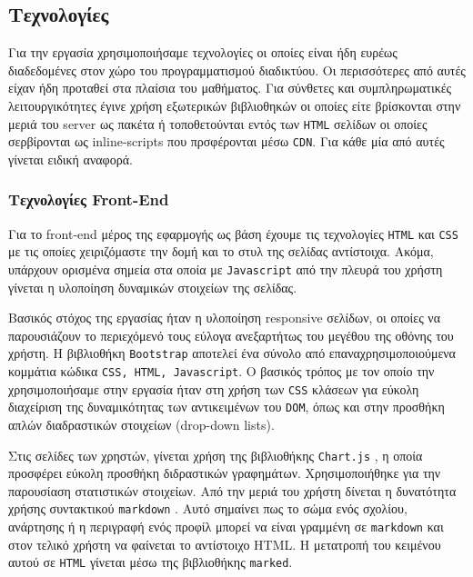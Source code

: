 \documentclass[nonacm, language=english, language=greek]{acmart}
\newcommand{\en}[1]{\textlatin{#1}}
\newcommand{\src}[1]{\texttt{\en{#1}}}
\begin{document}
\subsection{Τεχνολογίες}

Για την εργασία χρησιμοποιήσαμε τεχνολογίες οι οποίες 
είναι ήδη ευρέως διαδεδομένες στον χώρο του προγραμματισμού 
διαδικτύου. Οι περισσότερες από αυτές είχαν ήδη προταθεί 
στα πλαίσια του μαθήματος.
Για σύνθετες και συμπληρωματικές λειτουργικότητες έγινε 
χρήση εξωτερικών βιβλιοθηκών οι οποίες 
είτε βρίσκονται στην μεριά του \en{server} ως 
πακέτα ή τοποθετούνται εντός των \src{HTML} σελίδων 
οι οποίες σερβίρονται ως \en{inline-scripts} που πρσφέρονται 
μέσω \src{CDN}. \cite{CDN} Για κάθε μία από αυτές γίνεται ειδική αναφορά.

\subsubsection{Τεχνολογίες \en{Front-End}}

Για το \en{front-end} μέρος της εφαρμογής ως βάση έχουμε τις τεχνολογίες
\src{HTML} και \src{CSS} με τις οποίες χειριζόμαστε την δομή και το στυλ της
σελίδας αντίστοιχα. Ακόμα, υπάρχουν ορισμένα σημεία στα οποία με
\src{Javascript} από την πλευρά του χρήστη γίνεται η υλοποίηση δυναμικών
στοιχείων της σελίδας. 

Βασικός στόχος της εργασίας ήταν η υλοποίηση \en{responsive} σελίδων, οι οποίες
να παρουσιάζουν το περιεχόμενό τους εύλογα ανεξαρτήτως του μεγέθου της οθόνης
του χρήστη. Η βιβλιοθήκη \src{Bootstrap} \cite{Bootstrap} αποτελεί ένα σύνολο
από επαναχρησιμοποιούμενα κομμάτια κώδικα \src{CSS, HTML, Javascript}. Ο
βασικός τρόπος με τον οποίο την χρησιμοποιήσαμε στην εργασία ήταν στη χρήση των
\src{CSS} κλάσεων για εύκολη διαχείριση της δυναμικότητας των αντικειμένων του
\src{DOM}, όπως και στην προσθήκη απλών διαδραστικών στοιχείων \en{(drop-down
lists)}.

Στις σελίδες των χρηστών, γίνεται χρήση της βιβλιοθήκης \src{Chart.js}
\cite{ChartJS}, η οποία προσφέρει εύκολη προσθήκη διδραστικών γραφημάτων.
Χρησιμοποιήθηκε για την παρουσίαση στατιστικών στοιχείων. Από την μεριά του
χρήστη δίνεται η δυνατότητα χρήσης συντακτικού \src{markdown} \cite{Markdown}.
Αυτό σημαίνει πως το σώμα ενός σχολίου, ανάρτησης ή η περιγραφή ενός προφίλ
μπορεί να είναι γραμμένη σε \src{markdown} και στον τελικό χρήστη να φαίνεται
το αντίστοιχο \en{HTML}. Η μετατροπή του κειμένου αυτού σε \src{HTML} γίνεται
μέσω της βιβλιοθήκης \src{marked}. \cite{Marked}
\end{document}
